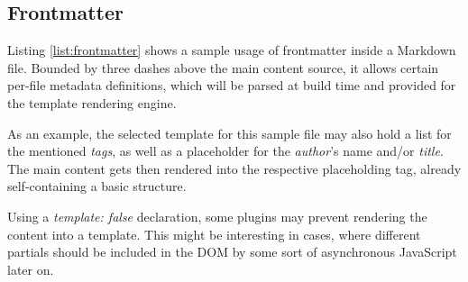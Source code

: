 \subsection{Frontmatter}
\label{sec:buildpipelines-frontmatter}



Listing \ref{list:frontmatter} shows a sample usage of frontmatter inside a Markdown file. Bounded by three dashes above the main content source, it allows certain per-file metadata definitions, which will be parsed at build time and provided for the template rendering engine.

As an example, the selected template for this sample file may also hold a list for the mentioned \emph{tags}, as well as a placeholder for the \emph{author}'s name and/or \emph{title}. The main content gets then rendered into the respective placeholding tag, already self-containing a basic structure.

Using a \emph{template: false} declaration, some plugins may prevent rendering the content into a template. This might be interesting in cases, where different partials should be included in the DOM by some sort of asynchronous JavaScript later on.
